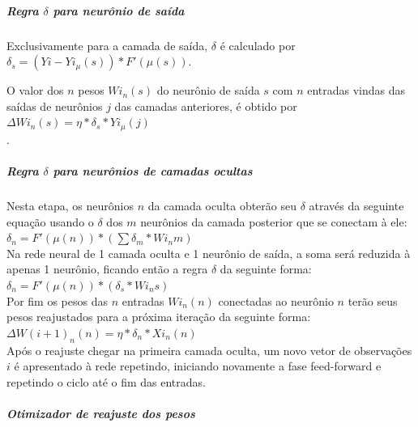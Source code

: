            \subparagraph*{Regra $\delta$ para neurônio de saída}
            Exclusivamente para a camada de saída, $\delta$ é calculado por\\
            $\delta_s = (Yi - Yi_{\mu}(s) )*F'(\mu(s))$.
            
            O valor dos $n$ pesos $Wi_{n}(s)$ do neurônio de saída $s$ com $n$ entradas vindas das saídas de neurônios $j$ das camadas anteriores, é obtido por $\Delta Wi_{n}(s) = \eta*\delta_s*Yi_{\mu}(j)$\\.

           \subparagraph*{Regra $\delta$ para neurônios de camadas ocultas}
            Nesta etapa, os neurônios $n$ da camada oculta obterão seu $\delta$ através da seguinte equação usando o $\delta$ dos $m$ neurônios da camada posterior que se conectam à ele:\\ 
            
            $\delta_n = F'(\mu(n))*(\sum \delta_m*Wi_{n}m)$\\
            
            Na rede neural de 1 camada oculta e 1 neurônio de saída, a soma será reduzida à apenas 1 neurônio, ficando então a regra $\delta$ da seguinte forma:\\
            
            $\delta_n = F'(\mu(n))*(\delta_s*Wi_{n}s)$\\
            
            Por fim os pesos das $n$ entradas $Wi_{n}(n)$ conectadas ao neurônio $n$ terão seus pesos reajustados para a próxima iteração da seguinte forma:\\
            $\Delta W(i+1)_{n}(n) = \eta*\delta_n*Xi_{n}(n)$\\
            
            Após o reajuste chegar na primeira camada oculta, um novo vetor de observações $i$ é apresentado à rede repetindo, iniciando novamente a fase feed-forward e repetindo o ciclo até o fim das entradas.
            
        \subparagraph{Otimizador de reajuste dos pesos}
        
